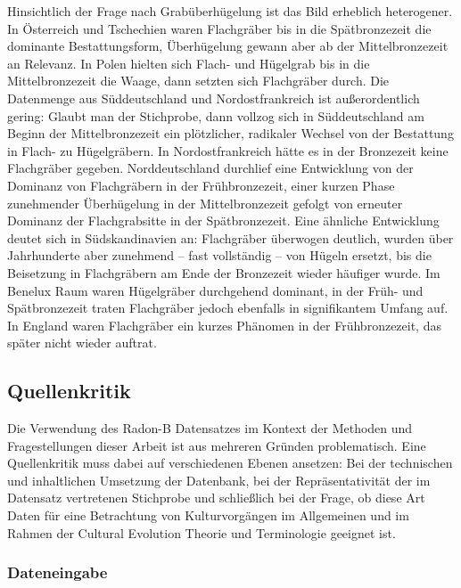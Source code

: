 \documentclass[openany,twoside,twocolumn]{book}
\begin{document}
Hinsichtlich der Frage nach Grabüberhügelung ist das Bild erheblich
heterogener. In Österreich und Tschechien waren Flachgräber bis in die
Spätbronzezeit die dominante Bestattungsform, Überhügelung gewann aber
ab der Mittelbronzezeit an Relevanz. In Polen hielten sich Flach- und
Hügelgrab bis in die Mittelbronzezeit die Waage, dann setzten sich
Flachgräber durch. Die Datenmenge aus Süddeutschland und
Nordostfrankreich ist außerordentlich gering: Glaubt man der Stichprobe,
dann vollzog sich in Süddeutschland am Beginn der Mittelbronzezeit ein
plötzlicher, radikaler Wechsel von der Bestattung in Flach- zu
Hügelgräbern. In Nordostfrankreich hätte es in der Bronzezeit keine
Flachgräber gegeben. Norddeutschland durchlief eine Entwicklung von der
Dominanz von Flachgräbern in der Frühbronzezeit, einer kurzen Phase
zunehmender Überhügelung in der Mittelbronzezeit gefolgt von erneuter
Dominanz der Flachgrabsitte in der Spätbronzezeit. Eine ähnliche
Entwicklung deutet sich in Südskandinavien an: Flachgräber überwogen
deutlich, wurden über Jahrhunderte aber zunehmend -- fast vollständig --
von Hügeln ersetzt, bis die Beisetzung in Flachgräbern am Ende der
Bronzezeit wieder häufiger wurde. Im Benelux Raum waren Hügelgräber
durchgehend dominant, in der Früh- und Spätbronzezeit traten Flachgräber
jedoch ebenfalls in signifikantem Umfang auf. In England waren
Flachgräber ein kurzes Phänomen in der Frühbronzezeit, das später nicht
wieder auftrat.

\hypertarget{source-criticism}{%
\subsection{Quellenkritik}\label{source-criticism}}

Die Verwendung des Radon-B Datensatzes im Kontext der Methoden und
Fragestellungen dieser Arbeit ist aus mehreren Gründen problematisch.
Eine Quellenkritik muss dabei auf verschiedenen Ebenen ansetzen: Bei der
technischen und inhaltlichen Umsetzung der Datenbank, bei der
Repräsentativität der im Datensatz vertretenen Stichprobe und
schließlich bei der Frage, ob diese Art Daten für eine Betrachtung von
Kulturvorgängen im Allgemeinen und im Rahmen der Cultural Evolution
Theorie und Terminologie geeignet ist.

\hypertarget{dateneingabe}{%
\subsubsection{Dateneingabe}\label{dateneingabe}}
\end{document}
